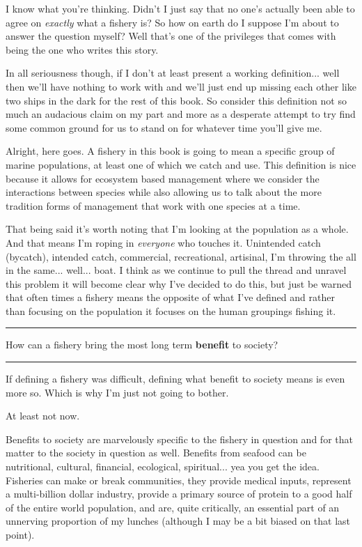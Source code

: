 \documentclass[11pt,a5paper]{book}
\begin{document}
I know what you're thinking. Didn't I just say that no one's actually been able to agree on \textit{exactly} what a fishery is? So how on earth do I suppose I'm about to answer the question myself? Well that's one of the privileges that comes with being the one who writes this story.
\newline

In all seriousness though, if I don't at least present a working definition... well then we'll have nothing to work with and we'll just end up missing each other like two ships in the dark for the rest of this book. So consider this definition not so much an audacious claim on my part and more as a desperate attempt to try find some common ground for us to stand on for whatever time you'll give me. 
\newline

Alright, here goes. A fishery in this book is going to mean a specific group of marine populations, at least one of which we catch and use. This definition is nice because it allows for ecosystem based management where we consider the interactions between species while also allowing us to talk about the more tradition forms of management that work with one species at a time. 
\newline

That being said it's worth noting that I'm looking at the population as a whole. And that means I'm roping in \textit{everyone} who touches it. Unintended catch (bycatch), intended catch, commercial, recreational, artisinal, I'm throwing the all in the same... well... boat. I think as we continue to pull the thread and unravel this problem it will become clear why I've decided to do this, but just be warned that often times a fishery means the opposite of what I've defined and rather than focusing on the population it focuses on the human groupings fishing it. 
\newpage

\noindent \rule{\textwidth}{0.5pt} 
\noindent How can a fishery bring the most long term \textbf{benefit} to society?
\newline
\rule{\textwidth}{0.5pt} 
\vspace{5pt}

If defining a fishery was difficult, defining what benefit to society means is even more so. Which is why I'm just not going to bother.
\newline

At least not now.
\newline

Benefits to society are marvelously specific to the fishery in question and for that matter to the society in question as well. Benefits from seafood can be nutritional, cultural, financial, ecological, spiritual... yea you get the idea. Fisheries can make or break communities, they provide medical inputs, represent a multi-billion dollar industry, provide a primary source of protein to a good half of the entire world population, and are, quite critically, an essential part of an unnerving proportion of my lunches (although I may be a bit biased on that last point).
\newline
\end{document}

